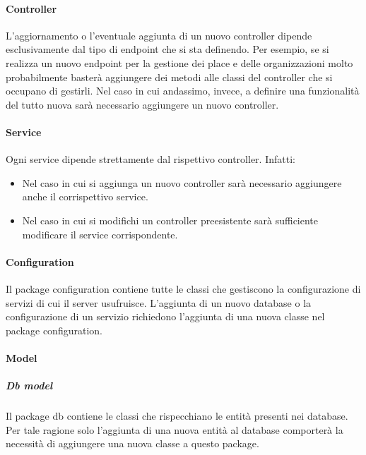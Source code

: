 \documentclass[../../manuale-manutentore.tex]{subfiles}
\begin{document}
\paragraph{Controller}%
\label{par:controller}

L'aggiornamento o l'eventuale aggiunta di un nuovo controller dipende esclusivamente dal tipo di endpoint che si sta definendo.
Per esempio, se si realizza un nuovo endpoint per la gestione dei place e delle organizzazioni molto probabilmente basterà aggiungere dei metodi
alle classi del controller che si occupano di gestirli.
Nel caso in cui andassimo, invece, a definire una funzionalità del tutto nuova
sarà necessario aggiungere un nuovo controller.

\paragraph{Service}%
\label{par:service}

Ogni service dipende strettamente dal rispettivo controller. Infatti:
\begin{itemize}
  \item Nel caso in cui si aggiunga un nuovo controller sarà necessario aggiungere anche il corrispettivo service.
  \item Nel caso in cui si modifichi un controller preesistente sarà sufficiente modificare il service corrispondente.
\end{itemize}

\paragraph{Configuration}%
\label{par:configuration}

Il package configuration contiene tutte le classi che gestiscono la configurazione di servizi di cui il server usufruisce.
L'aggiunta di un nuovo database o la configurazione di un servizio richiedono l'aggiunta di una nuova classe nel package configuration.

\paragraph{Model}%
\label{par:model}

\subparagraph{Db model}%
\label{subp:model}

Il package db contiene le classi che rispecchiano le entità presenti nei database.
Per tale ragione solo l'aggiunta di una nuova entità al database comporterà la necessità di aggiungere una nuova classe a questo package.
\end{document}
